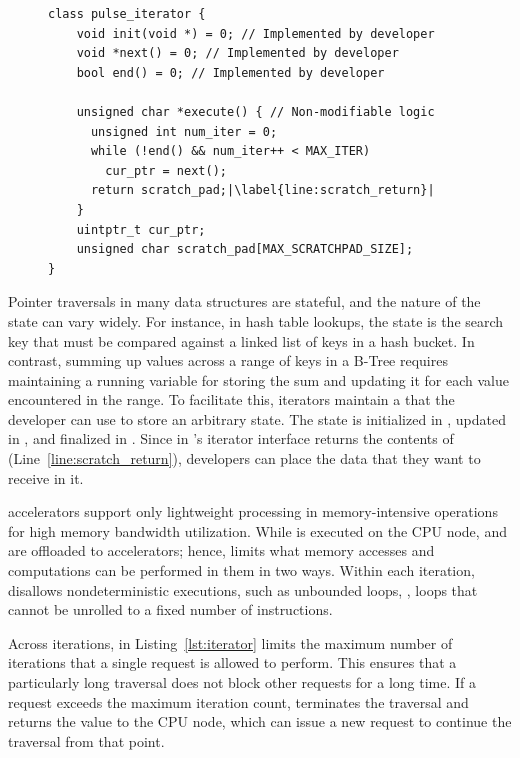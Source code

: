 \begin{figure}
\centering
\begin{lstlisting}[caption={\name interface.},label={lst:iterator},escapechar=|]
class pulse_iterator {
    void init(void *) = 0; // Implemented by developer
    void *next() = 0; // Implemented by developer
    bool end() = 0; // Implemented by developer
    
    unsigned char *execute() { // Non-modifiable logic
      unsigned int num_iter = 0;
      while (!end() && num_iter++ < MAX_ITER)
        cur_ptr = next();
      return scratch_pad;|\label{line:scratch_return}|
    }
    uintptr_t cur_ptr;
    unsigned char scratch_pad[MAX_SCRATCHPAD_SIZE];
}
\end{lstlisting}

\end{figure}

 Pointer traversals in many data structures are stateful, and the nature of the state can vary widely. For instance, in hash table lookups, the state is the search key that must be compared against a linked list of keys in a hash bucket. In contrast, summing up values across a range of keys in a B-Tree requires maintaining a running variable for storing the sum and updating it for each value encountered in the range. To facilitate this, \name iterators maintain a  that the developer can use to store an arbitrary state. The state is initialized in , updated in , and finalized in . Since  in \name's iterator interface returns the contents of  (Line~\ref{line:scratch_return}), developers can place the data that they want to receive in it.


 \name accelerators support only lightweight processing in memory-intensive operations for high memory bandwidth utilization. While  is executed on the CPU node,  and  are offloaded to \name accelerators; hence, \name limits what memory accesses and computations can be performed in them in two ways. Within each iteration, \name disallows nondeterministic executions, such as unbounded loops, \ie, loops that cannot be unrolled to a fixed number of instructions. 

Across iterations,  in Listing~\ref{lst:iterator} limits the maximum number of iterations that a single request is allowed to perform. This ensures that a particularly long traversal does not block other requests for a long time.  
If a request exceeds the maximum iteration count, \name terminates the traversal and returns the  value to the CPU node, which can issue a new request to continue the traversal from that point. 

